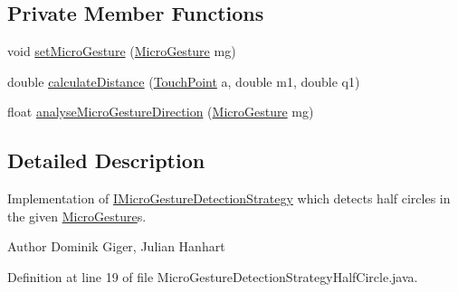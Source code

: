 \subsection*{Private Member Functions}
\begin{DoxyCompactItemize}
\item 
void \hyperlink{classch_1_1zhaw_1_1ba10__bsha__1_1_1strategies_1_1MicroGestureDetectionStrategyHalfCircle_aa8cae44f2d4c56a05d29eb5a1c53abdd}{setMicroGesture} (\hyperlink{classch_1_1zhaw_1_1ba10__bsha__1_1_1service_1_1MicroGesture}{MicroGesture} mg)
\item 
double \hyperlink{classch_1_1zhaw_1_1ba10__bsha__1_1_1strategies_1_1MicroGestureDetectionStrategyHalfCircle_a41f906c4c42a57ac8d1c6ae417fe6578}{calculateDistance} (\hyperlink{classch_1_1zhaw_1_1ba10__bsha__1_1_1TouchPoint}{TouchPoint} a, double m1, double q1)
\item 
float \hyperlink{classch_1_1zhaw_1_1ba10__bsha__1_1_1strategies_1_1MicroGestureDetectionStrategyHalfCircle_abc630df3a07afe93dacdc0fc3c788607}{analyseMicroGestureDirection} (\hyperlink{classch_1_1zhaw_1_1ba10__bsha__1_1_1service_1_1MicroGesture}{MicroGesture} mg)
\end{DoxyCompactItemize}


\subsection{Detailed Description}
Implementation of \hyperlink{interfacech_1_1zhaw_1_1ba10__bsha__1_1_1strategies_1_1IMicroGestureDetectionStrategy}{IMicroGestureDetectionStrategy} which detects half circles in the given \hyperlink{}{MicroGesture}s.

\begin{DoxyAuthor}{Author}
Dominik Giger, Julian Hanhart 
\end{DoxyAuthor}


Definition at line 19 of file MicroGestureDetectionStrategyHalfCircle.java.

